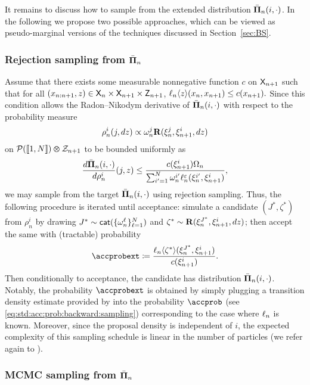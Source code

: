 It remains to discuss how to sample from the extended distribution $\bar{\boldsymbol{\Pi}}_{n}(i, \cdot)$. 
In the following we propose two possible approaches, which can be viewed as pseudo-marginal versions of the techniques discussed in Section~\ref{sec:BS}.  

\subsubsection*{Rejection sampling from $\bar{\boldsymbol{\Pi}}_{n}$} 

Assume that there exists some measurable nonnegative function $c$ on $\mathsf{X}_{n + 1}$ such that for all $(x_{n:n + 1}, z) \in \mathsf{X}_n \times \mathsf{X}_{n + 1} \times \mathsf{Z}_{n + 1}$,
$
\ell_{n} \langle z \rangle(x_n, x_{n + 1}) \leq c(x_{n + 1}).  
$
Since this condition allows the Radon--Nikodym derivative of $\bar{\boldsymbol{\Pi}}_{n}(i, \cdot)$ with respect to the probability measure 
\begin{equation} \label{eq:proposal:pm:rejection}
\rho_n^i(j, \rmd z) \propto \ewght{n}{j} \kernel{R}(\epart{n}{j}, \epart{n + 1}{i}, \rmd z)
\end{equation} 
on $\mathcal{P}(\llbracket 1, N \rrbracket) \varotimes \mathcal{Z}_{n + 1}$ to be bounded uniformly as 
$$
\frac{\rmd \trmext{n}(i, \cdot)}{\rmd \rho_n^i}(j, z) \leq \frac{c(\epart{n + 1}{i}) \sumwght{n}}{\sum_{i' = 1}^\N \ewght{n}{i'} \udmod{n}(\epart{n}{i'}, \epart{n + 1}{i})},  
$$ 
we may sample from the target $\bar{\boldsymbol{\Pi}}_{n}(i, \cdot)$ using rejection sampling. Thus, the following procedure is iterated until acceptance: simulate a candidate $(J^\ast, \zeta^\ast)$ from $\rho_n^i$ by drawing $J^\ast \sim \mathsf{cat}(\{ \omega_{n}^{\ell} \}_{\ell = 1}^N)$ and $\zeta^\ast \sim \mathbf{R}(\xi_{n}^{J^\ast}, \xi_{n + 1}^{i}, d z)$; then accept the same with (tractable) probability 
$$
\accprobext \eqdef \frac{\ukest{n}{\zeta^\ast}(\epart{n}{J^\ast}, \epart{n + 1}{i})}{c(\epart{n + 1}{i})}. 
$$ 
Then conditionally to acceptance, the candidate has distribution $\bar{\boldsymbol{\Pi}}_{n}(i, \cdot)$.  
Notably, the probability $\accprobext$ is obtained by simply plugging a transition density estimate provided by  into the probability $\accprob$ (see \eqref{eq:std:acc:prob:backward:sampling}) corresponding to the case where $\ell_{n}$ is known. Moreover, since the proposal density is independent of $i$, the expected complexity of this sampling schedule is linear in the number of particles (we refer again to \cite{douc:garivier:moulines:olsson:2010}).  

\subsubsection*{MCMC sampling from $\bar{\boldsymbol{\Pi}}_{n}$}

